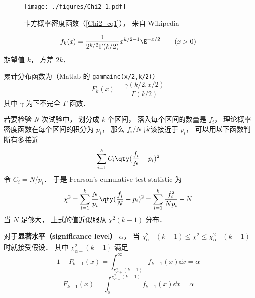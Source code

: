 
\begin{issues}
\issueDraft
\end{issues}

\begin{figure}[ht]
\centering
\texttt{[image: ./figures/Chi2\_1.pdf]}
\caption{卡方概率密度函数（\autoref{Chi2_eq1}）， 来自 Wikipedia} \label{Chi2_fig1}
\end{figure}

\begin{equation}\label{Chi2_eq1}
f_k(x) = \frac{1}{2^{k/2}\Gamma(k/2)}x^{k/2-1}\E^{-x/2} \qquad (x > 0)
\end{equation}
期望值 $k$， 方差 $2k$．

累计分布函数为（Matlab 的 \verb|gammainc(x/2,k/2)|）
\begin{equation}
F_k(x) = \frac{\gamma(k/2, x/2)}{\Gamma(k/2)}
\end{equation}
其中 $\gamma$ 为下不完全 $\Gamma$ 函数．


若要检验 $N$ 次试验中， 划分成 $k$ 个区间， 落入每个区间的数量是 $f_i$， 理论概率密度函数在每个区间的积分为 $p_i$， 那么 $f_i/N$ 应该接近于 $p_i$， 可以用以下函数判断有多接近
\begin{equation}
\sum_{i=1}^k C_i \qty(\frac{f_i}{N} - p_i)^2
\end{equation}
令 $C_i = N/p_i$． 于是 Pearson's cumulative test statistic 为
\begin{equation}
\chi^2 = \sum_{i=1}^k \frac{N}{p_i} \qty(\frac{f_i}{N} - p_i)^2 = \sum_{i=1}^k \frac{f_i^2}{Np_i} - N
\end{equation}
当 $N$ 足够大， 上式的值近似服从 $\chi^2(k-1)$ 分布．

对于\textbf{显著水平（significance level）} $\alpha$， 当 $\chi_{\alpha-}^2(k-1)\leqslant \chi^2 \leqslant \chi_{\alpha+}^2(k-1)$ 时就接受假设． 其中 $\chi_{\alpha\pm}^2(k-1)$ 满足
\begin{equation}
1 - F_{k-1}(x) = \int_{\chi_{\alpha+}^2(k-1)}^\infty f_{k-1}(x) \dd{x} = \alpha
\end{equation}
\begin{equation}
F_{k-1}(x) = \int_0^{\chi_{\alpha-}^2(k-1)} f_{k-1}(x) \dd{x} = \alpha
\end{equation}

